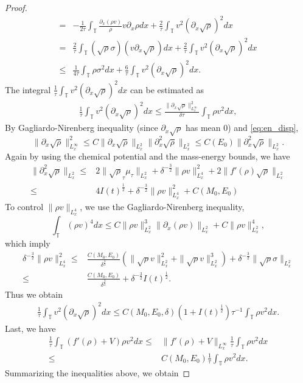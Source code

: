 \documentclass[leqno]{amsart}
\theoremstyle{plain}
\theoremstyle{definition}
\theoremstyle{remark}
\theoremstyle{plain}
\theoremstyle{plain}
\def\T{{\mathbb T}}%
\def\d{{\partial}}
\numberwithin{equation}{section}
\begin{document}
\begin{proof}
\begin{align*}
=&-\frac{1}{2\tau}\int_\T\frac{\d_x(\rho v)}{\rho}v\d_x\rho dx+\frac{2}{\tau}\int_\T v^2(\d_x\sqrt\rho)^2dx\\
=&\frac{2}{\tau}\int_\T(\sqrt\rho\sigma)( v\d_x\sqrt\rho) dx+\frac{2}{\tau}\int_\T v^2(\d_x\sqrt\rho)^2dx\\
\leq & \frac{1}{4\tau} \int_\T\rho\sigma^2dx+\frac{6}{\tau}\int_\T v^2(\d_x\sqrt\rho)^2dx.
\end{align*}
The integral $\frac{1}{\tau}\int_\T v^2(\d_x\sqrt\rho)^2dx$ can be estimated as
\begin{align*}
\frac{1}{\tau}\int_\T v^2(\d_x\sqrt\rho)^2dx\leq \frac{\|\d_x\sqrt\rho\|_{L^\infty_x}^2}{\delta\tau}\int_\T \rho v^2 dx,
\end{align*}
By Gagliardo-Nirenberg inequality (since $\d_x\sqrt\rho$ has mean $0$) and \eqref{eq:en_disp},
\[
\|\d_x\sqrt\rho\|_{L^\infty_x}^2\leq C \|\d_x\sqrt\rho\|_{L^2_x}\|\d_x^2\sqrt\rho\|_{L^2_x}\leq C(E_0)\|\d_x^2\sqrt\rho\|_{L^2_x}.
\]
Again by using the chemical potential and the mass-energy bounds, we have
\begin{align*}
\|\d_x^2\sqrt\rho\|_{L^2_x}\leq &2\|\sqrt\rho_\tau\mu_\tau\|_{L^2_x}+\delta^{-\frac32}\|\rho v\|_{L^4_x}^2+2\|f'(\rho)\sqrt\rho\|_{L^2_x}\\
\leq & 4 I(t)^\frac12+\delta^{-\frac32}\|\rho v\|_{L^4_x}^2+C(M_0,E_0)
\end{align*}
To control $\|\rho v\|_{L^4_x}$, we use the Gagliardo-Nirenberg inequality,
\[
\int_\T (\rho v)^4dx\leq C\|\rho v\|_{L^2_x}^3\|\d_x(\rho v)\|_{L^2_x}+C\|\rho v\|_{L^2_x}^4,
\]
which imply
\begin{align*}
\delta^{-\frac32}\|\rho v\|_{L^4_x}^2\leq& \frac{C(M_0,E_0)}{\delta^\frac32}(\|\sqrt\rho v\|_{L^2_x}^2+\|\sqrt\rho v\|_{L^2_x}^3)+\delta^{-\frac32}\|\sqrt\rho \sigma\|_{L^2_x}\\
\leq & \frac{C(M_0,E_0)}{\delta^\frac32}+\delta^{-\frac32}I(t)^\frac12.
\end{align*}
Thus we obtain
\begin{align*}
\frac{1}{\tau}\int_\T v^2(\d_x\sqrt\rho)^2dx\leq C(M_0,E_0,\delta)(1+I(t)^\frac12)\tau^{-1}\int_\T\rho v^2dx.
\end{align*}
Last, we have
\begin{align*}
\frac{1}{\tau}\int_\T (f'(\rho)+V)\rho v^2dx\leq&  \|f'(\rho)+V\|_{L^\infty_x}\frac{1}{\tau}\int_\T \rho v^2dx\\
\leq & C(M_0,E_0)\frac{1}{\tau}\int_\T \rho v^2dx.
\end{align*}
Summarizing the inequalities above, we obtain

\end{proof}
\end{document}
